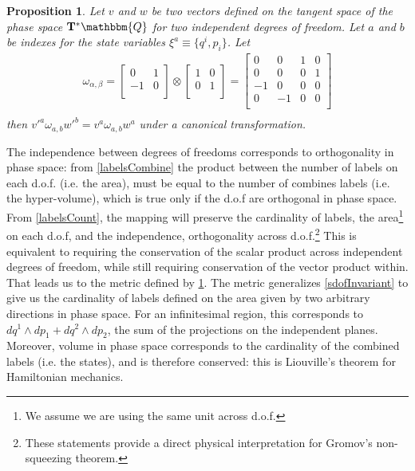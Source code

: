 \documentclass[aps,pra,10pt,twocolumn,floatfix,nofootinbib]{revtex4-1}
\newtheorem{prop}[thm]{Proposition}
\theoremstyle{definition}
\begin{document}
\begin{prop}\label{mdofInvariant}
Let $v$ and $w$ be two vectors defined on the tangent space of the phase space $\mathbf{T}^*\mathbbm{Q}$ for two independent degrees of freedom. Let $a$ and $b$ be indexes for the state variables $\xi^a\equiv \{q^i, p_i\}$. Let
\begin{align*}
\omega_{\alpha, \beta} =  \left[
  \begin{array}{cc}
    0 & 1 \\
    -1 & 0 \\
  \end{array}
\right] \otimes \left[
  \begin{array}{cc}
    1 & 0 \\
    0 & 1 \\
  \end{array}
\right] =
\left[
  \begin{array}{cccc}
    0 & 0 & 1 & 0 \\
    0 & 0 & 0 & 1 \\
    -1 & 0 & 0 & 0 \\
    0 & -1 & 0 & 0 \\
  \end{array}
\right] \\
\end{align*}
then $v'^{a} \omega_{a, b} w'^{b}=v^{a} \omega_{a, b} w^{a}$ under a canonical transformation.
\end{prop}

The independence between degrees of freedoms corresponds to orthogonality in phase space: from \ref{labelsCombine} the product between the number of labels on each d.o.f. (i.e. the area), must be equal to the number of combines labels (i.e. the hyper-volume), which is true only if the d.o.f are orthogonal in phase space. From \ref{labelsCount}, the mapping will preserve the cardinality of labels, the area\footnote{We assume we are using the same unit across d.o.f.} on each d.o.f, and the independence, orthogonality across d.o.f.\footnote{These statements provide a direct physical interpretation for Gromov's non-squeezing theorem\cite{Gromov,deGosson,Stewart}.} This is equivalent to requiring the conservation of the scalar product across independent degrees of freedom, while still requiring conservation of the vector product within. That leads us to the metric defined by \ref{mdofInvariant}.
The metric generalizes \ref{sdofInvariant} to give us the cardinality of labels defined on the area given by two arbitrary directions in phase space. For an infinitesimal region, this corresponds to $dq^1 \wedge dp_1 + dq^2 \wedge dp_2$, the sum of the projections on the independent planes. Moreover, volume in phase space corresponds to the cardinality of the combined labels (i.e. the states), and is therefore conserved: this is Liouville's theorem for Hamiltonian mechanics.
\end{document}
